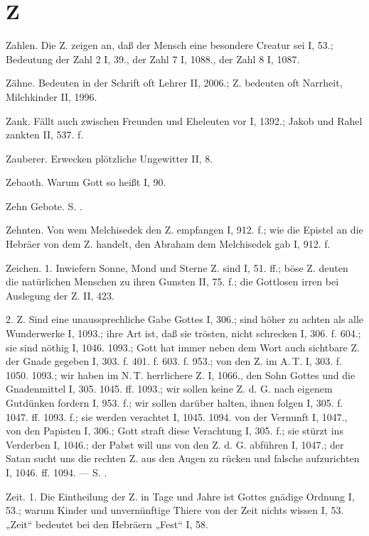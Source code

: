 \section{Z}

Zahlen. Die Z. zeigen an, daß der Mensch eine besondere Creatur sei I, 53.; Bedeutung der Zahl 2 I, 39., der Zahl 7 I, 1088., der Zahl 8 I, 1087.

Zähne. Bedeuten in der Schrift oft Lehrer II, 2006.;  Z. bedeuten oft Narrheit, Milchkinder II, 1996.

Zank. Fällt auch zwischen Freunden und Eheleuten vor I, 1392.; Jakob und Rahel zankten II, 537. f.

Zauberer. Erwecken plötzliche Ungewitter II, 8.

Zebaoth. Warum Gott so heißt I, 90.

Zehn Gebote. S. .

Zehnten. Von wem Melchisedek den Z. empfangen I, 912. f.; wie die Epistel an die Hebräer von dem Z. handelt, den Abraham dem Melchisedek gab I, 912. f.

Zeichen. 1.  Inwiefern Sonne, Mond und Sterne Z. sind I, 51. ff.; böse Z. deuten die natürlichen Menschen zu ihren Gunsten II, 75. f.; die Gottlosen irren bei Auslegung der Z. II, 423.

2. Z.  Sind eine unaussprechliche Gabe Gottes I, 306.; sind höher zu achten als alle Wunderwerke I, 1093.; ihre Art ist, daß sie trösten, nicht schrecken I, 306. f. 604.; sie sind nöthig I, 1046. 1093.; Gott hat immer neben dem Wort auch sichtbare Z. der Gnade gegeben I, 303. f. 401. f. 603. f. 953.; von den Z. im A.\,T. I, 303. f. 1050. 1093.; wir haben im N.\,T. herrlichere Z. I, 1066., den Sohn Gottes und die Gnadenmittel I, 305. 1045. ff. 1093.; wir sollen keine Z. d. G. nach eigenem Gutdünken fordern I, 953. f.; wir sollen darüber halten, ihnen folgen I, 305. f. 1047. ff. 1093. f.; sie werden verachtet I, 1045. 1094. von der Vernunft I, 1047., von den Papisten I, 306.; Gott straft diese Verachtung I, 305. f.; sie stürzt ins Verderben I, 1046.; der Pabst will uns von den Z. d. G. abführen I, 1047.; der Satan sucht uns die rechten Z. aus den Augen zu rücken und falsche aufzurichten I, 1046. ff. 1094. — S. .

Zeit. 1.  Die Eintheilung der Z. in Tage und Jahre ist Gottes gnädige Ordnung I, 53.; warum Kinder und unvernünftige Thiere von der Zeit nichts wissen I, 53. „Zeit“ bedeutet bei den Hebräern „Fest“ I, 58.

